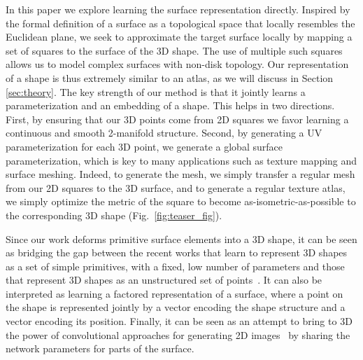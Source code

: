 \documentclass[10pt,twocolumn,letterpaper]{article}
\begin{document}
In this paper we explore learning the surface representation directly.  Inspired by the formal definition of a surface as a topological space that locally resembles the Euclidean plane, we seek to approximate the target surface locally by mapping a set of squares to the surface of the 3D shape. The use of multiple such squares allows us to model complex surfaces with non-disk topology. Our representation of a shape is thus extremely similar to an atlas, as we will discuss in Section \ref{sec:theory}. The key strength of our method is that it jointly learns a parameterization and an embedding of a shape. This helps in two directions. First, by ensuring that our 3D points come from 2D squares we favor learning a continuous and smooth 2-manifold structure. Second, by generating a UV parameterization for each 3D point, we generate a global surface parameterization, which is key to many applications such as texture mapping and surface meshing. Indeed, to generate the mesh, we simply transfer a regular mesh from our 2D squares to the 3D surface, and to generate a regular texture atlas, we simply optimize the metric of the square to become as-isometric-as-possible to the corresponding 3D shape (Fig.~\ref{fig:teaser_fig}). 

Since our work deforms primitive surface elements into a 3D shape, it can be seen as bridging the gap between the recent works that learn to represent 3D shapes as a set of simple primitives, with a fixed, low number of parameters \cite{tulsiani2016learning} and those that represent 3D shapes as an unstructured set of points~\cite{Fan:2017:cvpr}. It can also be interpreted as learning a factored representation of a surface, where a point on the shape is represented jointly by a vector encoding the shape structure and a vector encoding its position. Finally, it can be seen as an attempt to bring to 3D the power of convolutional approaches for generating 2D images~\cite{Isola:2017,Zhu:2017:cylcegan} by sharing the network parameters for parts of the surface.
\end{document}
